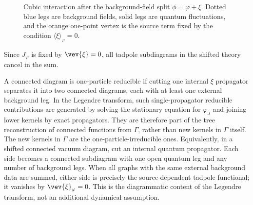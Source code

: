 \begin{figure}[!ht]
\centering
\caption{Cubic interaction after the background-field split
\(\phi=\varphi+\xi\).  Dotted blue legs are background fields, solid legs are
quantum fluctuations, and the orange one-point vertex is the source term fixed
by the condition \(\langle\xi\rangle_\varphi=0\).}
\label{fig:background-field-shifted-cubic-vertices}
\end{figure}
Since \(J_{\varphi}\) is fixed by \(\vev{\xi}=0\), all tadpole
subdiagrams in the shifted theory cancel in the sum.

\begin{remark}
\label{rem:opr-graphs-legendre-trees}
A connected diagram is one-particle reducible if cutting one internal
\(\xi\) propagator separates it into two connected diagrams, each
with at least one external background leg.  In the Legendre transform, such
single-propagator reducible contributions are generated by solving the
stationary equation for \(\varphi_J\) and joining lower kernels by exact
propagators.  They are therefore part of the tree reconstruction of connected
functions from \(\Gamma\), rather than new kernels in \(\Gamma\) itself.  The
new kernels in \(\Gamma\) are the one-particle-irreducible ones.
Equivalently, in a shifted connected vacuum diagram, cut an internal quantum
propagator.  Each side becomes a connected subdiagram with one open quantum
leg and any number of background legs.  When all graphs with the same
external background data are summed, either side is precisely the
source-dependent tadpole functional; it vanishes by
\(\vev{\xi}_\varphi=0\).  This is the diagrammatic content of the
Legendre transform, not an additional dynamical assumption.
\end{remark}

